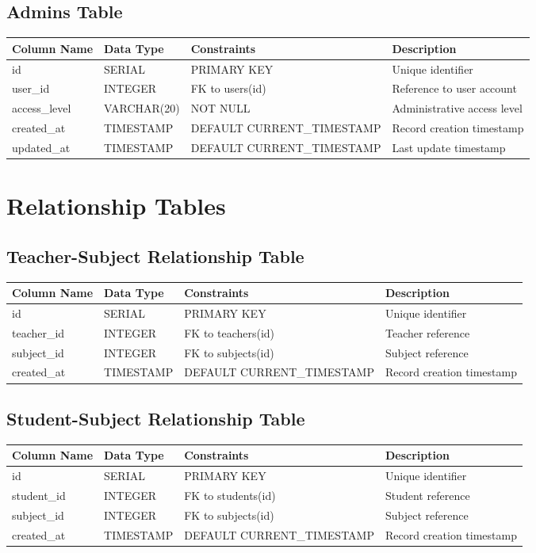 \documentclass[11pt,a4paper]{article}
\begin{document}
\subsection{Admins Table}
\begin{longtable}{|p{3cm}|p{3cm}|p{2cm}|p{6cm}|}
\hline
\textbf{Column Name} & \textbf{Data Type} & \textbf{Constraints} & \textbf{Description} \\
\hline
\endhead
id & SERIAL & PRIMARY KEY & Unique identifier \\
\hline
user\_id & INTEGER & FK to users(id) & Reference to user account \\
\hline
access\_level & VARCHAR(20) & NOT NULL & Administrative access level \\
\hline
created\_at & TIMESTAMP & DEFAULT CURRENT\_TIMESTAMP & Record creation timestamp \\
\hline
updated\_at & TIMESTAMP & DEFAULT CURRENT\_TIMESTAMP & Last update timestamp \\
\hline
\end{longtable}

\section{Relationship Tables}

\subsection{Teacher-Subject Relationship Table}
\begin{longtable}{|p{3cm}|p{3cm}|p{2cm}|p{6cm}|}
\hline
\textbf{Column Name} & \textbf{Data Type} & \textbf{Constraints} & \textbf{Description} \\
\hline
\endhead
id & SERIAL & PRIMARY KEY & Unique identifier \\
\hline
teacher\_id & INTEGER & FK to teachers(id) & Teacher reference \\
\hline
subject\_id & INTEGER & FK to subjects(id) & Subject reference \\
\hline
created\_at & TIMESTAMP & DEFAULT CURRENT\_TIMESTAMP & Record creation timestamp \\
\hline
\end{longtable}

\subsection{Student-Subject Relationship Table}
\begin{longtable}{|p{3cm}|p{3cm}|p{2cm}|p{6cm}|}
\hline
\textbf{Column Name} & \textbf{Data Type} & \textbf{Constraints} & \textbf{Description} \\
\hline
\endhead
id & SERIAL & PRIMARY KEY & Unique identifier \\
\hline
student\_id & INTEGER & FK to students(id) & Student reference \\
\hline
subject\_id & INTEGER & FK to subjects(id) & Subject reference \\
\hline
created\_at & TIMESTAMP & DEFAULT CURRENT\_TIMESTAMP & Record creation timestamp \\
\hline
\end{longtable}
\end{document}
